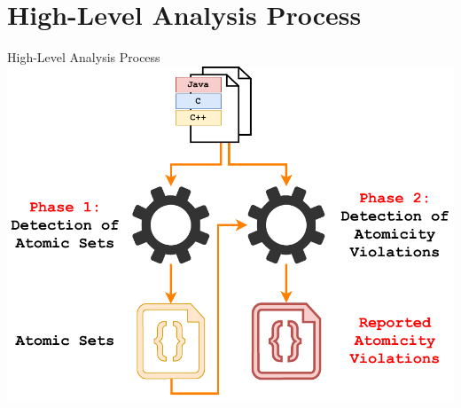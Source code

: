 \documentclass[10pt, xcolor=pdflatex, hyperref={unicode}, aspectratio=169]{beamer}
\begin{document}


\section{High-Level Analysis Process}
\begin{frame}{High-Level Analysis Process}
    \centering
    \includegraphics[width=.7 \linewidth]{analyser-proposal-sets.pdf}
\end{frame}


\end{document}
